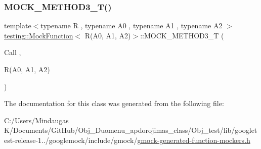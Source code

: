 \subsubsection{\texorpdfstring{MOCK\_METHOD3\_T()}{MOCK\_METHOD3\_T()}}
{\footnotesize\ttfamily template$<$typename R , typename A0 , typename A1 , typename A2 $>$ \\
\mbox{\hyperlink{classtesting_1_1_mock_function}{testing\+::\+Mock\+Function}}$<$ R(A0, A1, A2)$>$\+::M\+O\+C\+K\+\_\+\+M\+E\+T\+H\+O\+D3\+\_\+T (\begin{DoxyParamCaption}\item[{Call}]{,  }\item[{R(A0, A1, A2)}]{ }\end{DoxyParamCaption})}



The documentation for this class was generated from the following file\+:\begin{DoxyCompactItemize}
\item 
C\+:/\+Users/\+Mindaugas K/\+Documents/\+Git\+Hub/\+Obj\+\_\+\+Duomenu\+\_\+apdorojimas\+\_\+class/\+Obj\+\_\+test/lib/googletest-\/release-\/1../googlemock/include/gmock/\mbox{\hyperlink{_obj__test_2lib_2googletest-release-1_88_81_2googlemock_2include_2gmock_2gmock-generated-function-mockers_8h}{gmock-\/generated-\/function-\/mockers.\+h}}\end{DoxyCompactItemize}
